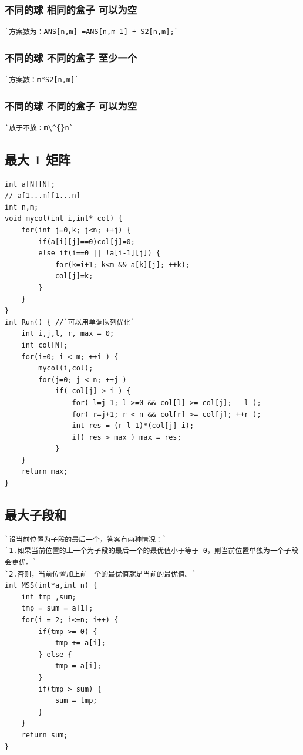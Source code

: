 \documentclass[a4paper]{article}
\begin{document}
\begin{CJK*}{UTF8}{gbsn}
\begin{multicols}{3}
\begin{flushleft}
\subsubsection{不同的球 相同的盒子 可以为空}
\begin{lstlisting}
`方案数为：ANS[n,m] =ANS[n,m-1] + S2[n,m];`
\end{lstlisting}

\subsubsection{不同的球 不同的盒子 至少一个}
\begin{lstlisting}
`方案数：m*S2[n,m]`
\end{lstlisting}

\subsubsection{不同的球 不同的盒子 可以为空}
\begin{lstlisting}
`放于不放：m\^{}n`
\end{lstlisting}


\subsection{最大 1 矩阵}
\begin{lstlisting}
int a[N][N];
// a[1...m][1...n]
int n,m;
void mycol(int i,int* col) {
    for(int j=0,k; j<n; ++j) {
        if(a[i][j]==0)col[j]=0;
        else if(i==0 || !a[i-1][j]) {
            for(k=i+1; k<m && a[k][j]; ++k);
            col[j]=k;
        }
    }
}
int Run() { //`可以用单调队列优化`
    int i,j,l, r, max = 0;
    int col[N];
    for(i=0; i < m; ++i ) {
        mycol(i,col);
        for(j=0; j < n; ++j )
            if( col[j] > i ) {
                for( l=j-1; l >=0 && col[l] >= col[j]; --l );
                for( r=j+1; r < n && col[r] >= col[j]; ++r );
                int res = (r-l-1)*(col[j]-i);
                if( res > max ) max = res;
            }
    }
    return max;
}
\end{lstlisting}

\subsection{最大子段和}
\begin{lstlisting}
`设当前位置为子段的最后一个，答案有两种情况：`
`1.如果当前位置的上一个为子段的最后一个的最优值小于等于 0，则当前位置单独为一个子段会更优。`
`2.否则，当前位置加上前一个的最优值就是当前的最优值。`
int MSS(int*a,int n) {
    int tmp ,sum;
    tmp = sum = a[1];
    for(i = 2; i<=n; i++) {
        if(tmp >= 0) {
            tmp += a[i];
        } else {
            tmp = a[i];
        }
        if(tmp > sum) {
            sum = tmp;
        }
    }
    return sum;
}
\end{lstlisting}


\end{flushleft}
\end{multicols}
\end{CJK*}
\end{document}
